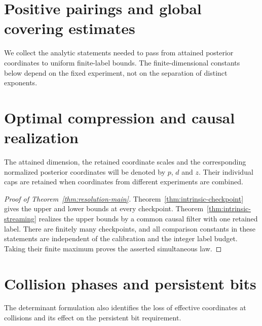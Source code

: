 










\section{Positive pairings and global covering estimates}
\label{sec:analytic-inputs}
We collect the analytic statements needed to pass from attained posterior coordinates to uniform finite-label bounds. The finite-dimensional constants below depend on the fixed experiment, not on the separation of distinct exponents.



\section{Optimal compression and causal realization}
\label{sec:direct-classification}
The attained dimension, the retained coordinate scales and the corresponding normalized posterior coordinates will be denoted by $p$, $d$ and $z$. Their individual caps are retained when coordinates from different experiments are combined.

\begin{proof}[Proof of Theorem~\ref{thm:resolution-main}]
Theorem~\ref{thm:intrinsic-checkpoint} gives the upper and lower bounds at every checkpoint. Theorem~\ref{thm:intrinsic-streaming} realizes the upper bounds by a common causal filter with one retained label. There are finitely many checkpoints, and all comparison constants in these statements are independent of the calibration and the integer label budget. Taking their finite maximum proves the asserted simultaneous law.
\end{proof}

\section{Collision phases and persistent bits}
\label{sec:collision-phases}
The determinant formulation also identifies the loss of effective coordinates at collisions and its effect on the persistent bit requirement.















